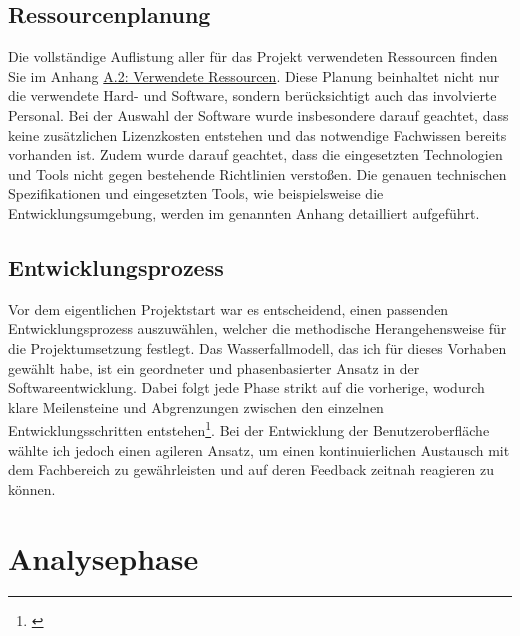 \documentclass[a4paper,12pt]{article}
\begin{document}
\subsection{Ressourcenplanung}
\label{sec:ressourcenplanung}
Die vollständige Auflistung aller für das Projekt verwendeten Ressourcen finden Sie im Anhang \hyperref[sec:ressourcen]{A.2: Verwendete Ressourcen}. Diese Planung beinhaltet nicht nur die verwendete Hard- und Software, sondern berücksichtigt auch das involvierte Personal. Bei der Auswahl der Software wurde insbesondere darauf geachtet, dass keine zusätzlichen Lizenzkosten entstehen und das notwendige Fachwissen bereits vorhanden ist. Zudem wurde darauf geachtet, dass die eingesetzten Technologien und Tools nicht gegen bestehende Richtlinien verstoßen. Die genauen technischen Spezifikationen und eingesetzten Tools, wie beispielsweise die Entwicklungsumgebung, werden im genannten Anhang detailliert aufgeführt.

\subsection{Entwicklungsprozess}
\label{sec:entwicklungsprozess}
Vor dem eigentlichen Projektstart war es entscheidend, einen passenden Entwicklungsprozess auszuwählen, welcher die methodische Herangehensweise für die Projektumsetzung festlegt. Das Wasserfallmodell, das ich für dieses Vorhaben gewählt habe, ist ein geordneter und phasenbasierter Ansatz in der Softwareentwicklung. Dabei folgt jede Phase strikt auf die vorherige, wodurch klare Meilensteine und Abgrenzungen zwischen den einzelnen Entwicklungsschritten entstehen\footnote{\citeauthor{pressman2014software}}. Bei der Entwicklung der Benutzeroberfläche wählte ich jedoch einen agileren Ansatz, um einen kontinuierlichen Austausch mit dem Fachbereich zu gewährleisten und auf deren Feedback zeitnah reagieren zu können.

\section{Analysephase}
\end{document}
